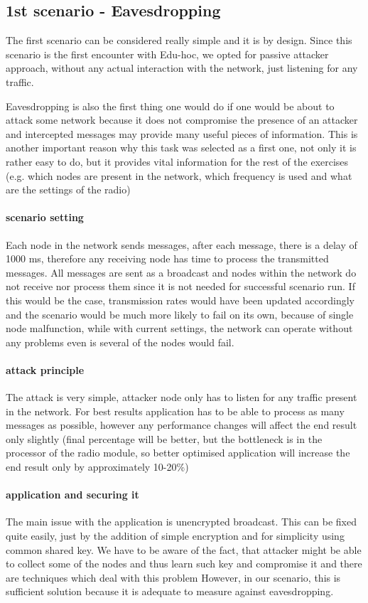 \documentclass[
  print, %
  Table,   %
  nolof,     %
  nolot,     %
           oneside
]{fithesis3}
\begin{document}
    \subsection{1st scenario - Eavesdropping}\label{subsec:1st}
    The first scenario can be considered really simple and it is by design. Since this scenario is the first encounter with Edu-hoc, we opted for passive attacker approach, without any actual interaction with the network, just listening for any traffic.

    Eavesdropping is also the first thing one would do if one would be about to attack some network because it does not compromise the presence of an attacker and intercepted messages may provide many useful pieces of information. This is another important reason why this task was selected as a first one, not only it is rather easy to do, but it provides vital information for the rest of the exercises (e.g. which nodes are present in the network, which frequency is used and what are the settings of the radio)

    \paragraph{scenario setting}
    Each node in the network sends messages, after each message, there is a delay of 1000 ms, therefore any receiving node has time to process the transmitted messages. All messages are sent as a broadcast and nodes within the network do not receive nor process them since it is not needed for successful scenario run. If this would be the case, transmission rates would have been updated accordingly and the scenario would be much more likely to fail on its own, because of single node malfunction, while with current settings, the network can operate without any problems even is several of the nodes would fail.

    \paragraph{attack principle}
    The attack is very simple, attacker node only has to listen for any traffic present in the network. For best results application has to be able to process as many messages as possible, however any performance changes will affect the end result only slightly (final percentage will be better, but the bottleneck is in the processor of the radio module, so better optimised application will increase the end result only by approximately 10-20\%)
    \paragraph{application and securing it}
    The main issue with the application is unencrypted broadcast. This can be fixed quite easily, just by the addition of simple encryption and for simplicity using common shared key. We have to be aware of the fact, that attacker might be able to collect some of the nodes and thus learn such key and compromise it and there are techniques which deal with this problem %
    However, in our scenario, this is sufficient solution because it is adequate to measure against eavesdropping.
\end{document}
